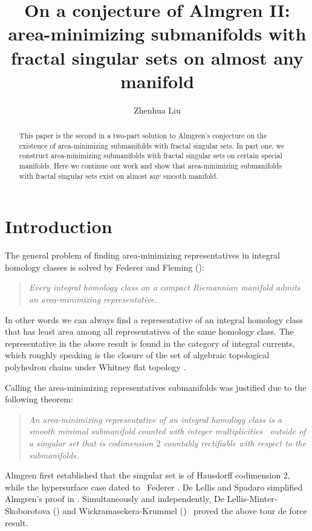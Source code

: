 \documentclass[11pt,a4paper]{amsart}
\title[Fractal singular sets II]{On a conjecture of Almgren II: area-minimizing submanifolds with fractal singular sets on almost any manifold}
\author{Zhenhua Liu}
\numberwithin{equation}{section}
\theoremstyle{plain}
\theoremstyle{definition}
\numberwithin{equation}{subsection}
\begin{document}
	\setlength{\abovedisplayskip}{5pt}
	\setlength{\belowdisplayskip}{5pt}
	\setlength{\abovedisplayshortskip}{5pt}
	\setlength{\belowdisplayshortskip}{5pt}
	\maketitle\vspace{-3em}
	\begin{abstract}
		This paper is the second in a two-part solution to Almgren's conjecture on the existence of area-minimizing submanifolds with fractal singular sets. In part one, we construct area-minimizing submanifolds with fractal singular sets on certain special manifolds. Here we continue our work and show that area-minimizing submanifolds with fractal singular sets exist on almost any smooth manifold. 
	\end{abstract}
	\section{Introduction}
	The general problem of finding area-minimizing representatives in integral homology classes is solved by Federer and Fleming (\cite{FF}):
	\begin{quote}
		\emph{Every integral homology class on a compact Riemannian manifold admits an area-minimizing representative.}
	\end{quote}
	In other words we can always find a representative of an integral homology class that has least area among all representatives of the same homology class. The representative in the above result is found in the category of integral currents, which roughly speaking is the closure of the set of algebraic topological polyhedron chains under Whitney flat topology \cite{FF}.
	
	Calling the area-minimizing representatives submanifolds was justified due to the following theorem:
	\begin{quote}
		\emph{An area-minimizing representative of an integral homology class is a smooth minimal submanifold counted with integer multiplicities  outside of a singular set that is codimension $2$ countably rectifiable with respect to the submanifolds.}
	\end{quote}Almgren \cite{FA} first established that the singular set is of Hausdorff codimension $2,$ while the hypersurface case dated to  Federer \cite{HFts}. De Lellis and Spadaro simplified Almgren's proof in \cite{DS1,DS2,DS3}. Simultaneously and independently, De Lellis-Minter-Skoborotova 
	(\cite{DMS1,DMS2,DMS3}) and Wickramasekera-Krummel (\cite{BK1,BK2,BK3})  proved the above tour de force result. 
	
\end{document}
